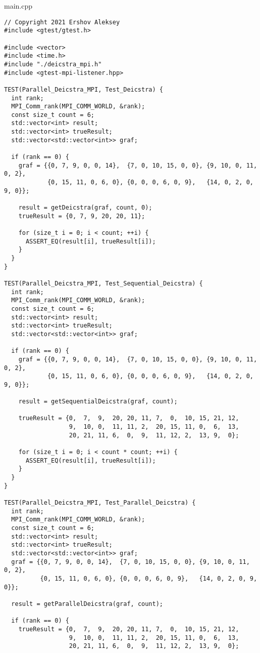 \documentclass{report}
\begin{document}
main.cpp
\begin{lstlisting}
// Copyright 2021 Ershov Aleksey
#include <gtest/gtest.h>

#include <vector>
#include <time.h>
#include "./deicstra_mpi.h"
#include <gtest-mpi-listener.hpp>

TEST(Parallel_Deicstra_MPI, Test_Deicstra) {
  int rank;
  MPI_Comm_rank(MPI_COMM_WORLD, &rank);
  const size_t count = 6;
  std::vector<int> result;
  std::vector<int> trueResult;
  std::vector<std::vector<int>> graf;

  if (rank == 0) {
    graf = {{0, 7, 9, 0, 0, 14},  {7, 0, 10, 15, 0, 0}, {9, 10, 0, 11, 0, 2},
            {0, 15, 11, 0, 6, 0}, {0, 0, 0, 6, 0, 9},   {14, 0, 2, 0, 9, 0}};

    result = getDeicstra(graf, count, 0);
    trueResult = {0, 7, 9, 20, 20, 11};

    for (size_t i = 0; i < count; ++i) {
      ASSERT_EQ(result[i], trueResult[i]);
    }
  }
}

TEST(Parallel_Deicstra_MPI, Test_Sequential_Deicstra) {
  int rank;
  MPI_Comm_rank(MPI_COMM_WORLD, &rank);
  const size_t count = 6;
  std::vector<int> result;
  std::vector<int> trueResult;
  std::vector<std::vector<int>> graf;

  if (rank == 0) {
    graf = {{0, 7, 9, 0, 0, 14},  {7, 0, 10, 15, 0, 0}, {9, 10, 0, 11, 0, 2},
            {0, 15, 11, 0, 6, 0}, {0, 0, 0, 6, 0, 9},   {14, 0, 2, 0, 9, 0}};

    result = getSequentialDeicstra(graf, count);

    trueResult = {0,  7,  9,  20, 20, 11, 7,  0,  10, 15, 21, 12,
                  9,  10, 0,  11, 11, 2,  20, 15, 11, 0,  6,  13,
                  20, 21, 11, 6,  0,  9,  11, 12, 2,  13, 9,  0};

    for (size_t i = 0; i < count * count; ++i) {
      ASSERT_EQ(result[i], trueResult[i]);
    }
  }
}

TEST(Parallel_Deicstra_MPI, Test_Parallel_Deicstra) {
  int rank;
  MPI_Comm_rank(MPI_COMM_WORLD, &rank);
  const size_t count = 6;
  std::vector<int> result;
  std::vector<int> trueResult;
  std::vector<std::vector<int>> graf;
  graf = {{0, 7, 9, 0, 0, 14},  {7, 0, 10, 15, 0, 0}, {9, 10, 0, 11, 0, 2},
          {0, 15, 11, 0, 6, 0}, {0, 0, 0, 6, 0, 9},   {14, 0, 2, 0, 9, 0}};

  result = getParallelDeicstra(graf, count);

  if (rank == 0) {
    trueResult = {0,  7,  9,  20, 20, 11, 7,  0,  10, 15, 21, 12,
                  9,  10, 0,  11, 11, 2,  20, 15, 11, 0,  6,  13,
                  20, 21, 11, 6,  0,  9,  11, 12, 2,  13, 9,  0};


\end{lstlisting}
\end{document}
